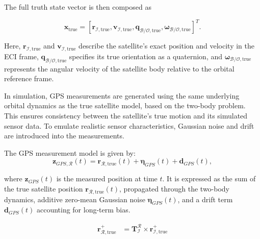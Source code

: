The full truth state vector is then composed as

\begin{equation}
\mathbf{x}_\text{true} = [\mathbf{r}_{\mathcal{I},\text{true}}, \mathbf{v}_{\mathcal{I},\text{true}}, \mathbf{q}_{\mathcal{B/O},\text{true}}, \boldsymbol{\omega}_{\mathcal{B/O},\text{true}}]^T.
\end{equation}

\noindent
Here, $\mathbf{r}_{\mathcal{I},\text{true}}$ and $\mathbf{v}_{\mathcal{I},\text{true}}$ describe the satellite's exact position and velocity in the ECI frame, $\mathbf{q}_{\mathcal{B/O},\text{true}}$ specifies its true orientation as a quaternion, and $\boldsymbol{\omega}_{\mathcal{B/O},\text{true}}$ represents the angular velocity of the satellite body relative to the orbital reference frame.


\label{sec:GPSModel}

In simulation, GPS measurements are generated using the same underlying orbital dynamics as the true satellite model, based on the two-body problem. This ensures consistency between the satellite’s true motion and its simulated sensor data. To emulate realistic sensor characteristics, Gaussian noise and drift are introduced into the measurements.
\vspace{0.5cm}

\noindent The GPS measurement model is given by:
\begin{equation}
    \mathbf{z}_{GPS,\mathcal{R}}(t) = \mathbf{r}_{\mathcal{R},\text{true}}(t) + \boldsymbol{\eta}_{GPS}(t) + \mathbf{d}_{GPS}(t),
\end{equation}

\noindent where $\mathbf{z}_{GPS}(t)$ is the measured position at time $t$. It is expressed as the sum of the true satellite position $\mathbf{r}_{\mathcal{R},\text{true}}(t)$, propagated through the two-body dynamics, additive zero-mean Gaussian noise $\boldsymbol{\eta}_{GPS}(t)$, and a drift term $\mathbf{d}_{GPS}(t)$ accounting for long-term bias.

\begin{equation}
    \begin{split}
        \mathbf{r}_{\mathcal{R},\text{true}}^+ &= \mathbf{T}_\mathcal{I}^\mathcal{R} \times \mathbf{r}_{\mathcal{I},\text{true}}^+ \\
    \end{split}
\end{equation}

